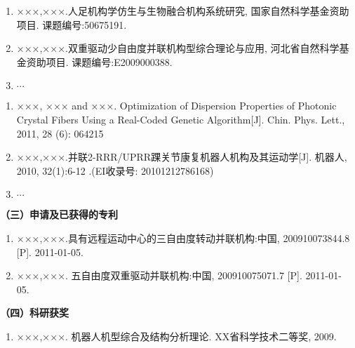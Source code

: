 \begin{achievement}

\project
\begin{enumerate}\setlength{\itemsep}{0pt}
\renewcommand{\labelenumi}{[\theenumi]}
\item ×××,×××.人足机构学仿生与生物融合机构系统研究, 国家自然科学基金资助项目. 课题编号:50675191.
\item ×××,×××.双重驱动少自由度并联机构型综合理论与应用, 河北省自然科学基金资助项目. 课题编号:E2009000388.
\item $\cdots$
\end{enumerate}
\publications
\begin{enumerate}\setlength{\itemsep}{0pt}
\renewcommand{\labelenumi}{[\theenumi]}
\item ×××, ××× and ×××. Optimization of Dispersion Properties of Photonic Crystal Fibers Using a Real-Coded Genetic Algorithm[J]. Chin. Phys. Lett., 2011, 28 (6): 064215
\item ×××,×××.并联2-RRR/UPRR踝关节康复机器人机构及其运动学[J]. 机器人, 2010, 32(1):6-12 .(EI收录号: 20101212786168)
\item $\cdots$
\end{enumerate}

{\noindent\textbf{（三）申请及已获得的专利}}    %
\begin{enumerate}\setlength{\itemsep}{0pt}
\renewcommand{\labelenumi}{[\theenumi]}
\item ×××,×××.具有远程运动中心的三自由度转动并联机构:中国, 200910073844.8 [P]. 2011-01-05.
\item ×××,×××. 五自由度双重驱动并联机构:中国, 200910075071.7 [P]. 2011-01-05.
\end{enumerate}

{\noindent\textbf{（四）科研获奖}}    %
\begin{enumerate}\setlength{\itemsep}{0pt}
\renewcommand{\labelenumi}{[\theenumi]}
\item ×××,×××. 机器人机型综合及结构分析理论. XX省科学技术二等奖, 2009.
\end{enumerate}
\end{achievement} 